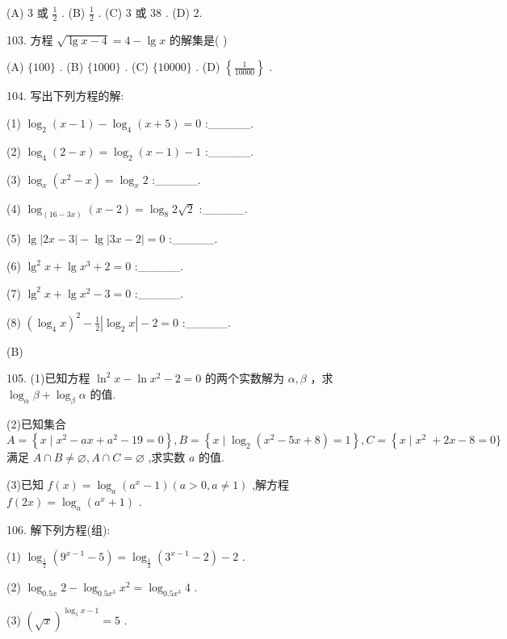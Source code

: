 \documentclass[10pt]{article}
\begin{document}
(A) 3 或 \(\frac{1}{2}\) . (B) \(\frac{1}{2}\) . (C) 3 或 38 . (D) 2.

103. 方程 \(\sqrt{\lg x - 4} = 4 - \lg x\) 的解集是( )

(A) \(\{ {100}\}\) . (B) \(\{ {1000}\}\) . (C) \(\{ {10000}\}\) . (D) \(\left\{  \frac{1}{10000}\right\}\) .

104. 写出下列方程的解:

(1) \({\log }_{2}\left( {x - 1}\right)  - {\log }_{4}\left( {x + 5}\right)  = 0\) :\_\_\_\_\_.

(2) \({\log }_{4}\left( {2 - x}\right)  = {\log }_{2}\left( {x - 1}\right)  - 1\) :\_\_\_\_\_.

(3) \({\log }_{x}\left( {{x}^{2} - x}\right)  = {\log }_{x}2\) :\_\_\_\_\_.

(4) \({\log }_{\left( {16} - 3x\right) }\left( {x - 2}\right)  = {\log }_{8}2\sqrt{2}\) :\_\_\_\_\_.

(5) \(\lg \left| {{2x} - 3}\right|  - \lg \left| {{3x} - 2}\right|  = 0\) :\_\_\_\_\_.

(6) \({\lg }^{2}x + \lg {x}^{3} + 2 = 0\) :\_\_\_\_\_.

(7) \({\lg }^{2}x + \lg {x}^{2} - 3 = 0\) :\_\_\_\_\_.

(8) \({\left( {\log }_{4}x\right) }^{2} - \frac{1}{2}\left| {{\log }_{2}x}\right|  - 2 = 0\) :\_\_\_\_\_.

(B)

105. (1)已知方程 \({\ln }^{2}x - \ln {x}^{2} - 2 = 0\) 的两个实数解为 \(\alpha ,\beta\) ，求 \({\log }_{\alpha }\beta  + {\log }_{\beta }\alpha\) 的值.

(2)已知集合 \(A = \left\{  {x \mid  {x}^{2} - {ax} + {a}^{2} - {19} = 0}\right\}  ,B = \left\{  {x \mid  {\log }_{2}\left( {{x}^{2} - {5x} + 8}\right)  = 1}\right\}  ,C = \left\{  {x \mid  {x}^{2}}\right. \; + {2x} - 8 = 0\}\) 满足 \(A \cap  B \neq  \varnothing ,A \cap  C = \varnothing\) ,求实数 \(a\) 的值.

(3)已知 \(f\left( x\right)  = {\log }_{a}\left( {{a}^{x} - 1}\right) \left( {a > 0,a \neq  1}\right)\) ,解方程 \(f\left( {2x}\right)  = {\log }_{a}\left( {{a}^{x} + 1}\right)\) .

106. 解下列方程(组):

(1) \({\log }_{\frac{1}{2}}\left( {{9}^{x - 1} - 5}\right)  = {\log }_{\frac{1}{2}}\left( {{3}^{x - 1} - 2}\right)  - 2\) .

(2) \({\log }_{0.5x}2 - {\log }_{{0.5}{x}^{3}}{x}^{2} = {\log }_{{0.5}{x}^{3}}4\) .

(3) \({\left( \sqrt{x}\right) }^{{\log }_{5}x - 1} = 5\) .
\end{document}
